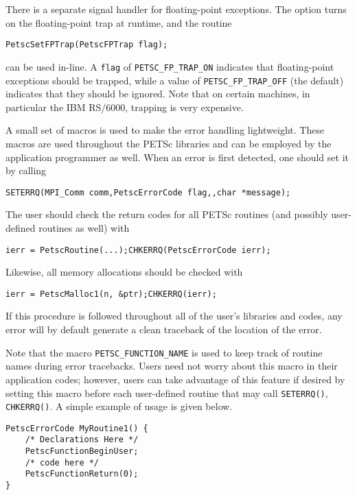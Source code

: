 {{There is a separate signal handler for floating-point exceptions.
 
The option  turns on the floating-point trap at runtime,
and the routine  
\begin{lstlisting}
PetscSetFPTrap(PetscFPTrap flag);
\end{lstlisting}
can be used in-line.
A \lstinline{flag} of \lstinline{PETSC_FP_TRAP_ON} 
indicates that floating-point exceptions should be trapped,
while a value of \lstinline{PETSC_FP_TRAP_OFF} (the default) indicates that they
should be ignored.  Note that on certain machines, in particular
the IBM RS/6000, trapping is very expensive.

A small set of macros is used to make the error handling lightweight.
These macros are used throughout the PETSc libraries and can be employed
by the application   
programmer as well.  When an error is first detected,
one should set it by calling
\begin{lstlisting}
SETERRQ(MPI_Comm comm,PetscErrorCode flag,,char *message);
\end{lstlisting}
The user should check the return codes for all PETSc routines (and
possibly user-defined routines as well) with
\begin{lstlisting}
ierr = PetscRoutine(...);CHKERRQ(PetscErrorCode ierr);
\end{lstlisting}
Likewise, all memory allocations should be checked with
\begin{lstlisting}
ierr = PetscMalloc1(n, &ptr);CHKERRQ(ierr);
\end{lstlisting}
If this procedure is followed throughout all of the user's libraries
and codes, any error will by default generate a clean traceback of
the location  
of the error.

Note that the macro \lstinline{PETSC_FUNCTION_NAME} is used to keep track of
routine names during error tracebacks.  Users need not worry about this
macro in their application codes; however, users can take advantage of this feature
if desired by setting this macro before each user-defined routine
that may call \lstinline{SETERRQ()}, \lstinline{CHKERRQ()}.
A simple example of usage is given below.
\begin{lstlisting}
PetscErrorCode MyRoutine1() { 
    /* Declarations Here */
    PetscFunctionBeginUser;
    /* code here */
    PetscFunctionReturn(0);
}
\end{lstlisting}

}}
